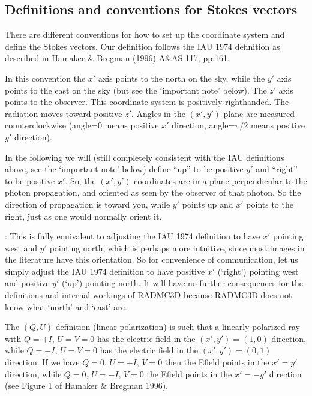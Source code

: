 \documentclass[letterpaper,10pt,english]{sphinxmanual}
\begin{document}
\subsection{Definitions and conventions for Stokes vectors}
\label{\detokenize{dustradtrans:definitions-and-conventions-for-stokes-vectors}}\label{\detokenize{dustradtrans:sec-definitions-stokes}}
There are different conventions for how to set up the coordinate system and
define the Stokes vectors. Our definition follows the IAU 1974 definition as
described in Hamaker \& Bregman (1996) A\&AS 117, pp.161.

In this convention the \(x'\) axis points to the north on the sky, while the
\(y'\) axis points to the east on the sky (but see the ‘important note’
below). The \(z'\) axis points to the observer. This coordinate system is
positively right\sphinxhyphen{}handed. The radiation moves toward positive \(z'\). Angles
in the \((x',y')\) plane are measured counter\sphinxhyphen{}clockwise (angle=0 means
positive \(x'\) direction, angle=\(\pi/2\) means positive \(y'\)
direction).

In the following we will (still completely consistent with the IAU definitions
above, see the ‘important note’ below) define “up” to be positive \(y'\) and
“right” to be positive \(x'\). So, the \((x',y')\) coordinates are in a
plane perpendicular to the photon propagation, and oriented as seen by the
observer of that photon. So the direction of propagation is toward you, while
\(y'\) points up and \(x'\) points to the right, just as one would
normally orient it.

: This is fully equivalent to adjusting the IAU 1974 definition
to have \(x'\) pointing west and \(y'\) pointing north, which is perhaps
more intuitive, since most images in the literature have this orientation. So
for convenience of communication, let us simply adjust the IAU 1974 definition
to have positive \(x'\) (‘right’) pointing west and positive \(y'\)
(‘up’) pointing north.  It will have no further consequences for the definitions
and internal workings of RADMC\sphinxhyphen{}3D because RADMC\sphinxhyphen{}3D does not know what ‘north’
and ‘east’ are.

The \((Q,U)\) definition (linear polarization) is such that a linearly
polarized ray with \(Q=+I\), \(U=V=0\) has the electric field in the
\((x',y')=(1,0)\) direction, while \(Q=-I\), \(U=V=0\) has the
electric field in the \((x',y')=(0,1)\) direction. If we have \(Q=0\),
\(U=+I\), \(V=0\) then the E\sphinxhyphen{}field points in the \(x'=y'\)
direction, while \(Q=0\), \(U=-I\), \(V=0\) the E\sphinxhyphen{}field points in
the \(x'=-y'\) direction (see Figure 1 of Hamaker \& Bregman 1996).
\end{document}
